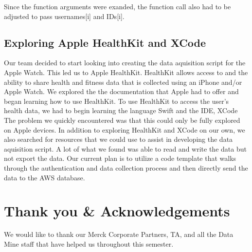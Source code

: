 \documentclass[]{book}
\newenvironment{Shaded}{\begin{snugshade}}{\end{snugshade}}
\newcommand{\KeywordTok}[1]{\textcolor[rgb]{0.13,0.29,0.53}{\textbf{#1}}}
\newcommand{\DecValTok}[1]{\textcolor[rgb]{0.00,0.00,0.81}{#1}}
\newcommand{\SpecialCharTok}[1]{\textcolor[rgb]{0.00,0.00,0.00}{#1}}
\newcommand{\StringTok}[1]{\textcolor[rgb]{0.31,0.60,0.02}{#1}}
\newcommand{\CommentTok}[1]{\textcolor[rgb]{0.56,0.35,0.01}{\textit{#1}}}
\newcommand{\ControlFlowTok}[1]{\textcolor[rgb]{0.13,0.29,0.53}{\textbf{#1}}}
\newcommand{\OperatorTok}[1]{\textcolor[rgb]{0.81,0.36,0.00}{\textbf{#1}}}
\newcommand{\BuiltInTok}[1]{#1}
\newcommand{\NormalTok}[1]{#1}
\begin{document}
Since the function arguments were exanded, the function call also had to
be adjusted to pass usernames{[}i{]} and IDs{[}i{]}.

\begin{Shaded}
\end{Shaded}

\subsection{Exploring Apple HealthKit and
XCode}\label{exploring-apple-healthkit-and-xcode}

Our team decided to start looking into creating the data aquisition
script for the Apple Watch. This led us to Apple HealthKit. HealthKit
allows access to and the ability to share health and fitness data that
is collected using an iPhone and/or Apple Watch. We explored the the
documentation that Apple had to offer and began learning how to use
HealthKit. To use HealthKit to access the user's health data, we had to
begin learning the language Swift and the IDE, XCode The problem we
quickly encountered was that this could only be fully explored on Apple
devices. In addition to exploring HealthKit and XCode on our own, we
also searched for resources that we could use to assist in developing
the data aquisition script. A lot of what we found was able to read and
write the data but not export the data. Our current plan is to utilize a
code template that walks through the authentication and data collection
process and then directly send the data to the AWS database.

\section{Thank you \&
Acknowledgements}\label{thank-you-acknowledgements}

We would like to thank our Merck Corporate Partners, TA, and all the
Data Mine staff that have helped us throughout this semester.
\end{document}
